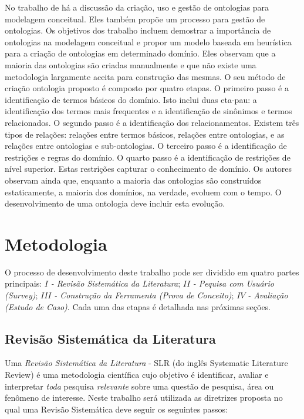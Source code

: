 \documentclass[msc,proposal,hidelot,hideabstract]{ppgccufmg} %
\begin{document}
No trabalho de \cite{sugumaran2002ontologies} há a discussão da criação, uso e gestão de ontologias para modelagem conceitual. Eles também propõe um processo para gestão de ontologias. Os objetivos dos trabalho incluem demostrar a importância de ontologias na modelagem conceitual e propor um modelo baseada em heurística  para a criação de ontologias em determinado domínio. Eles observam que a maioria das ontologias são criadas manualmente e que não existe uma metodologia largamente aceita para construção das mesmas. O seu método de criação ontologia proposto é composto por quatro etapas. O primeiro passo é a identificação de termos básicos do domínio. Isto inclui duas eta-pau: a identificação dos termos mais frequentes e a identificação de sinônimos e termos relacionados. O segundo passo é a identificação dos relacionamentos. Existem três tipos de relações: relações entre termos básicos, relações entre ontologias, e as relações entre ontologias e sub-ontologias. O terceiro passo é a identificação de restrições e regras do domínio. O quarto passo é a identificação de restrições de nível superior. Estas restrições capturar o conhecimento de domínio. Os autores observam ainda que, enquanto a maioria das ontologias são construídos estaticamente, a maioria dos domínios, na verdade, evoluem com o tempo. O desenvolvimento de uma ontologia deve incluir esta evolução.

\chapter{Metodologia}
\label{ch:metodologia}

O processo de desenvolvimento deste trabalho pode ser dividido em quatro partes
principais: $I$\textit{ - Revisão Sistemática da Literatura}; $II$\textit{ -
  Pequisa com Usuário (Survey)}; $III$\textit{ - Construção da Ferramenta
  (Prova de Conceito)}; $IV$\textit{ - Avaliação (Estudo de Caso)}. Cada uma das etapas é detalhada nas próximas seções.

\section{Revisão Sistemática da Literatura}
\label{sec:revisao_sistematica}

Uma \textit{Revisão Sistemática da Literatura} - SLR (do inglês Systematic Literature Review) é uma
metodologia científica cujo objetivo é identificar, avaliar e interpretar
\textit{toda} pesquisa \textit{relevante} sobre uma questão de pesquisa, área
ou fenômeno de
interesse\cite{keele2007guidelines,wohlin2012experimentation}. Neste trabalho
será utilizada as diretrizes proposta \cite{keele2007guidelines} no qual uma
Revisão Sistemática deve seguir os seguintes passos:
\end{document}
